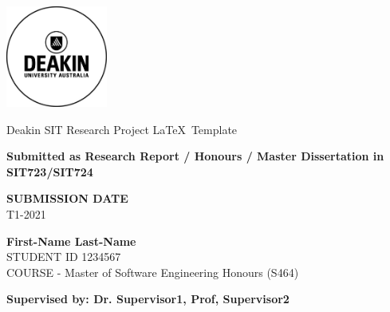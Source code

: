 \documentclass[12pt]{article}
\begin{document}
\onehalfspacing
\thispagestyle{empty} 
\begin{titlepage}
    \includegraphics[width=0.25\textwidth]{Figures/Deakin_Logo.jpeg}
    \begin{center}
       \vspace*{4cm}
       {\LARGE Deakin SIT Research Project \LaTeX~Template} %
       \vspace{3cm}
    \begin{large}   
    
        
        {\bf Submitted as Research Report / Honours / Master Dissertation in SIT723/SIT724}
       \vspace{1cm}
        
        {\bf SUBMISSION DATE} \\
        T1-2021        
        
       \vspace{3cm}
       \textbf{First-Name Last-Name}\\
       STUDENT ID 1234567 \\
       COURSE - Master of Software Engineering Honours (S464)
       \vfill

       {\bf \normalsize Supervised by: Dr. Supervisor1, Prof, Supervisor2}\\
       
    \end{large}  
   \end{center}
\end{titlepage}

\newpage 
\thispagestyle{plain} 


\newpage
\begin{singlespacing}
\tableofcontents
\end{singlespacing}
\setlength{\parskip}{1em}
\renewcommand{\baselinestretch}{2.0}

\newpage
\listoffigures
\listoftables

\newpage 
{}
\setcounter{page}{1}
\onehalfspacing










\newpage
\singlespacing

\end{document}
